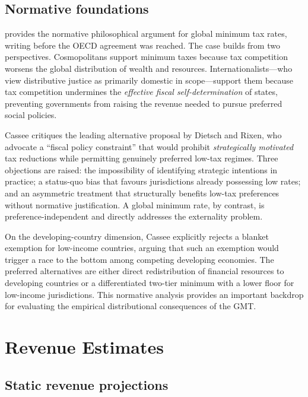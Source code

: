 \documentclass[12pt,a4paper]{article}
\begin{document}
\subsection{Normative foundations}

\textcite{cassee2019} provides the normative philosophical argument for global minimum tax rates, writing before the OECD agreement was reached.
The case builds from two perspectives.
Cosmopolitans support minimum taxes because tax competition worsens the global distribution of wealth and resources.
Internationalists---who view distributive justice as primarily domestic in scope---support them because tax competition undermines the \emph{effective fiscal self-determination} of states, preventing governments from raising the revenue needed to pursue preferred social policies.

Cassee critiques the leading alternative proposal by Dietsch and Rixen, who advocate a ``fiscal policy constraint'' that would prohibit \emph{strategically motivated} tax reductions while permitting genuinely preferred low-tax regimes.
Three objections are raised: the impossibility of identifying strategic intentions in practice; a status-quo bias that favours jurisdictions already possessing low rates; and an asymmetric treatment that structurally benefits low-tax preferences without normative justification.
A global minimum rate, by contrast, is preference-independent and directly addresses the externality problem.

On the developing-country dimension, Cassee explicitly rejects a blanket exemption for low-income countries, arguing that such an exemption would trigger a race to the bottom among competing developing economies.
The preferred alternatives are either direct redistribution of financial resources to developing countries or a differentiated two-tier minimum with a lower floor for low-income jurisdictions.
This normative analysis provides an important backdrop for evaluating the empirical distributional consequences of the GMT.


\section{Revenue Estimates}\label{sec:revenue}

\subsection{Static revenue projections}
\end{document}
